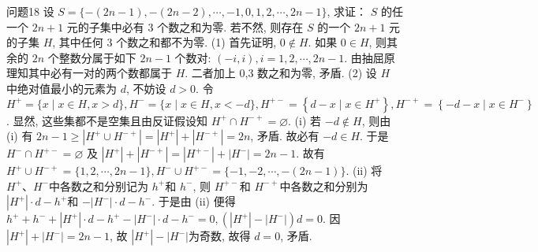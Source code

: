 问题18 设 $S=\{-(2 n-1),-(2 n-2), \cdots,-1,0,1,2, \cdots, 2 n-1\}$, 求证： $S$ 的任一个 $2 n+1$ 元的子集中必有 3 个数之和为零.
若不然, 则存在 $S$ 的一个 $2 n+1$ 元的子集 $H$, 其中任何 3 个数之和都不为零.
(1) 首先证明, $0 \notin H$. 如果 $0 \in H$, 则其余的 $2 n$ 个整数分属于如下 $2 n-1$ 个数对: $(-i, i), i=1,2, \cdots, 2 n-1$. 由抽屈原理知其中必有一对的两个数都属于 $H$. 二者加上 0,3 数之和为零, 矛盾.
(2) 设 $H$ 中绝对值最小的元素为 $d$, 不妨设 $d>0$. 令 $H^{+}=\{x \mid x \in H, x>d\}, H^{-}=\{x \mid x \in H, x<-d\}, H^{+-}=\left\{d-x \mid x \in H^{+}\right\}, H^{-+}= \left\{-d-x \mid x \in H^{-}\right\}$. 显然, 这些集都不是空集且由反证假设知 $H^{+} \cap H^{-+}= \varnothing$. (i)
若 $-d \notin H$, 则由 (i) 有 $2 n-1 \geqslant\left|H^{+} \cup H^{-+}\right|=\left|H^{+}\right|+\left|H^{-+}\right|=2 n$, 矛盾.
故必有 $-d \in H$. 于是 $H^{-} \cap H^{+-}=\varnothing$ 及 $\left|H^{+}\right|+\left|H^{-+}\right|=\left|H^{+-}\right|+ \left|H^{-}\right|=2 n-1$. 故有 $H^{+} \cup H^{-+}=\{1,2, \cdots, 2 n-1\}, H^{-} \cup H^{+-}=\{-1,-2, \cdots,-(2 n-1)\}$. (ii)
将 $H^{+} 、 H^{-}$中各数之和分别记为 $h^{+}$和 $h^{-}$, 则 $H^{+-}$和 $H^{-+}$中各数之和分别为 $\left|H^{+}\right| \cdot d-h^{+}$和 $-\left|H^{-}\right| \cdot d-h^{-}$. 于是由 (ii) 便得 $h^{+}+h^{-}+\left|H^{+}\right| \cdot d-h^{+}-\left|H^{-}\right| \cdot d-h^{-}=0,\left(\left|H^{+}\right|-\left|H^{-}\right|\right) d=0$. 因 $\left|H^{+}\right|+\left|H^{-}\right|=2 n-1$, 故 $\left|H^{+}\right|-\left|H^{-}\right|$为奇数, 故得 $d=0$, 矛盾.



